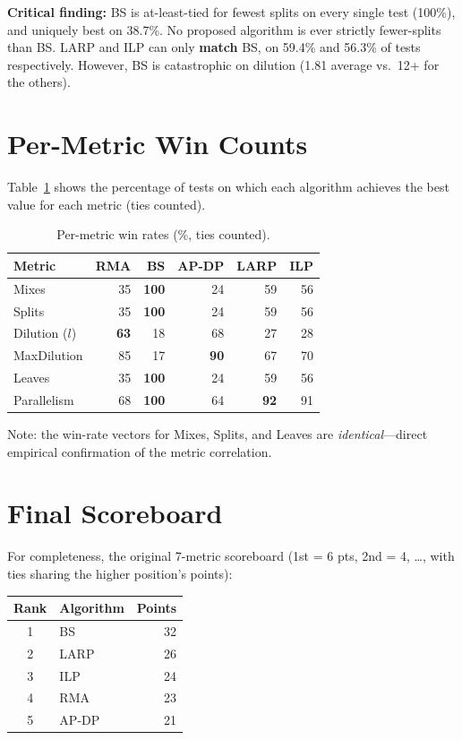 \textbf{Critical finding:} BS is at-least-tied for fewest splits on every single test (100\%), and uniquely best on 38.7\%. No proposed algorithm is ever strictly fewer-splits than BS. LARP and ILP can only \textbf{match} BS, on 59.4\% and 56.3\% of tests respectively. However, BS is catastrophic on dilution (1.81 average vs.\ 12+ for the others).

\section{Per-Metric Win Counts}

Table~\ref{tab:per_metric_wins} shows the percentage of tests on which each algorithm achieves the best value for each metric (ties counted).

\begin{table}[H]
\centering
\caption{Per-metric win rates (\%, ties counted).}
\label{tab:per_metric_wins}
\begin{tabular}{|l|r|r|r|r|r|}
\hline
\textbf{Metric} & \textbf{RMA} & \textbf{BS} & \textbf{AP-DP} & \textbf{LARP} & \textbf{ILP} \\
\hline
Mixes & 35 & \textbf{100} & 24 & 59 & 56 \\
\hline
Splits & 35 & \textbf{100} & 24 & 59 & 56 \\
\hline
Dilution ($l$) & \textbf{63} & 18 & 68 & 27 & 28 \\
\hline
MaxDilution & 85 & 17 & \textbf{90} & 67 & 70 \\
\hline
Leaves & 35 & \textbf{100} & 24 & 59 & 56 \\
\hline
Parallelism & 68 & \textbf{100} & 64 & \textbf{92} & 91 \\
\hline
\end{tabular}
\end{table}

Note: the win-rate vectors for Mixes, Splits, and Leaves are \textit{identical}---direct empirical confirmation of the metric correlation.

\section{Final Scoreboard}

For completeness, the original 7-metric scoreboard (1st = 6 pts, 2nd = 4, \ldots, with ties sharing the higher position's points):

\begin{center}
\begin{tabular}{|c|l|r|}
\hline
\textbf{Rank} & \textbf{Algorithm} & \textbf{Points} \\
\hline
1 & BS & 32 \\
\hline
2 & LARP & 26 \\
\hline
3 & ILP & 24 \\
\hline
4 & RMA & 23 \\
\hline
5 & AP-DP & 21 \\
\hline
\end{tabular}
\end{center}

